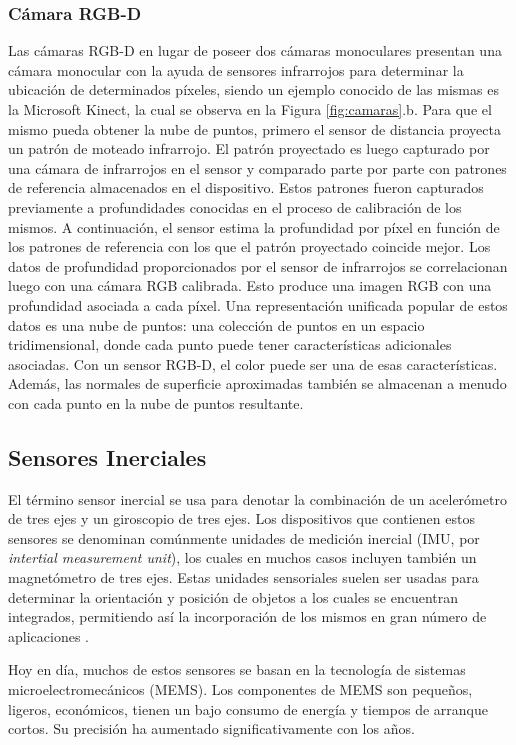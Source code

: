 \ifimagenes
\else
\subsubsection{Cámara RGB-D}
Las cámaras RGB-D \cite{hogman2011} en lugar de poseer dos cámaras monoculares presentan una cámara monocular con la ayuda de sensores infrarrojos para determinar la ubicación de determinados píxeles, siendo un ejemplo conocido de las mismas es la Microsoft Kinect, la cual se observa en la Figura \ref{fig:camaras}.b. Para que el mismo pueda obtener la nube de puntos, primero el sensor de distancia proyecta un patrón de moteado infrarrojo. El patrón proyectado es luego capturado por una cámara de infrarrojos en el sensor y comparado parte por parte con patrones de referencia almacenados en el dispositivo. Estos patrones fueron capturados previamente a profundidades conocidas en el proceso de calibración de los mismos. A continuación, el sensor estima la profundidad por píxel en función de los patrones de referencia con los que el patrón proyectado coincide mejor. Los datos de profundidad proporcionados por el sensor de infrarrojos se correlacionan luego con una cámara RGB calibrada. Esto produce una imagen RGB con una profundidad asociada a cada píxel. Una representación unificada popular de estos datos es una nube de puntos: una colección de puntos en un espacio tridimensional, donde cada punto puede tener características adicionales asociadas. Con un sensor RGB-D, el color puede ser una de esas características. Además, las normales de superficie aproximadas también se almacenan a menudo con cada punto en la nube de puntos resultante.

\subsection{Sensores Inerciales}
El término sensor inercial se usa para denotar la combinación de un acelerómetro de tres ejes y un giroscopio de tres ejes. Los dispositivos que contienen estos sensores se denominan comúnmente unidades de medición inercial (IMU, por \textit{intertial measurement unit}), los cuales en muchos casos incluyen también un magnetómetro de tres ejes. Estas unidades sensoriales suelen ser usadas para determinar la orientación y posición de objetos a los cuales se encuentran integrados, permitiendo así la incorporación de los mismos en gran número de aplicaciones \cite{hol2011}\cite{perlmutter2012}.

Hoy en día, muchos de estos sensores se basan en la tecnología de sistemas microelectromecánicos (MEMS). Los componentes de MEMS son pequeños, ligeros, económicos, tienen un bajo consumo de energía y tiempos de arranque cortos. Su precisión ha aumentado significativamente con los años.

